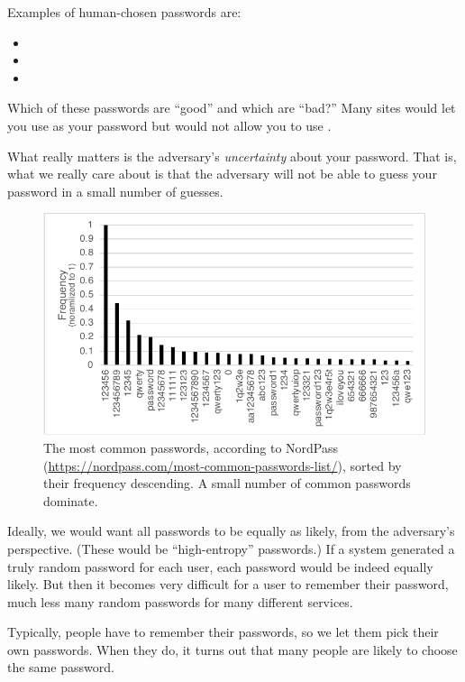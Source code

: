 Examples of human-chosen passwords are:
\begin{itemize}
	\item {}
	\item {}
	\item {}
\end{itemize}

Which of these passwords are ``good'' and which
are ``bad?''
Many sites would let you use
 as your password but would not allow
you to use .

What really matters is the adversary's
\emph{uncertainty} about your password.
That is, what we really care about is that the adversary
will not be able to guess your password in
a small number of guesses.


\begin{figure}
  \includegraphics[width=\textwidth]{figs/password-dist.pdf}
  \caption{The most common passwords, according to
  NordPass (\url{https://nordpass.com/most-common-passwords-list/}),
  sorted by their frequency descending.
A small number of common passwords dominate.}
\end{figure}

Ideally, we would want all passwords to be equally as likely,
from the adversary's perspective.
(These would be ``high-entropy'' passwords.)
If a system generated a truly random password for each user,
each password would be indeed equally likely.
But then it becomes very difficult for a user to remember their 
password, much less many random passwords for many different services.

Typically, people have to remember their passwords,
so we let them pick their own passwords.
When they do,
it turns out that many people are likely to choose
the same password.

